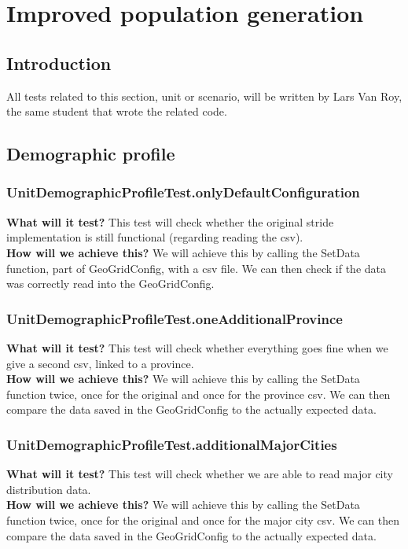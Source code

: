 \documentclass{article}
\begin{document}
\section{Improved population generation}
\subsection{Introduction}
All tests related to this section, unit or scenario, will be written by Lars Van Roy, the same student that wrote the related code.
\subsection{Demographic profile}
\subsubsection{UnitDemographicProfileTest.onlyDefaultConfiguration} 
\textbf{What will it test?} 
This test will check whether the original stride implementation is still functional (regarding reading the csv). \\
\newline
\textbf{How will we achieve this?} 
We will achieve this by calling the SetData function, part of GeoGridConfig, with a csv file. We can then check if the data was correctly read into the GeoGridConfig.

\subsubsection{UnitDemographicProfileTest.oneAdditionalProvince}
\textbf{What will it test?} 
This test will check whether everything goes fine when we give a second csv, linked to a province. \\
\newline
\textbf{How will we achieve this?}
We will achieve this by calling the SetData function twice, once for the original and once for the province csv. We can then compare the data saved in the GeoGridConfig to the actually expected data.

\subsubsection{UnitDemographicProfileTest.additionalMajorCities}
\textbf{What will it test?} 
This test will check whether we are able to read major city distribution data. \\
\newline
\textbf{How will we achieve this?}
We will achieve this by calling the SetData function twice, once for the original and once for the major city csv. We can then compare the data saved in the GeoGridConfig to the actually expected data.
\end{document}
